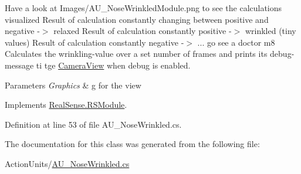 Have a look at Images/\+A\+U\+\_\+\+Nose\+Wrinkled\+Module.\+png to see the calculations visualized Result of calculation constantly changing between positive and negative -\/$>$ relaxed Result of calculation constantly positive -\/$>$ wrinkled (tiny values) Result of calculation constantly negative -\/$>$ ... go see a doctor m8 Calculates the wrinkling-\/value over a set number of frames and prints its\textquotesingle{} debug-\/message ti tge \hyperlink{class_real_sense_1_1_camera_view}{Camera\+View} when debug is enabled. 
\begin{DoxyParams}{Parameters}
{\em Graphics} & g for the view \\
\hline
\end{DoxyParams}


Implements \hyperlink{class_real_sense_1_1_r_s_module_a2ec830b7932ee7c0077d473f81c73867}{Real\+Sense.\+R\+S\+Module}.



Definition at line 53 of file A\+U\+\_\+\+Nose\+Wrinkled.\+cs.



The documentation for this class was generated from the following file\+:\begin{DoxyCompactItemize}
\item 
Action\+Units/\hyperlink{_a_u___nose_wrinkled_8cs}{A\+U\+\_\+\+Nose\+Wrinkled.\+cs}\end{DoxyCompactItemize}
